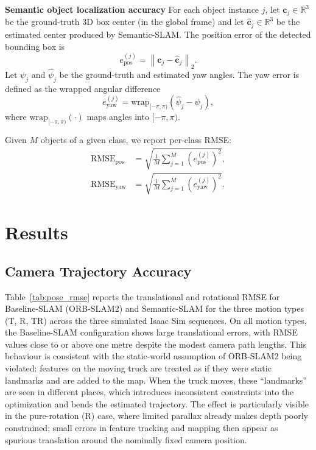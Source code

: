 \documentclass[letterpaper, 10 pt, conference]{IEEEtran}  %
\begin{document}
\noindent\textbf{Semantic object localization accuracy}
For each object instance $j$, let $\mathbf{c}_j\in\mathbb{R}^3$ be the ground-truth 3D box center (in the global frame) and let $\hat{\mathbf{c}}_j\in\mathbb{R}^3$ be the estimated center produced by Semantic-SLAM. The position error of the detected bounding box is
\begin{equation}
e^{(j)}_{\mathrm{pos}}=\left\lVert \mathbf{c}_j-\hat{\mathbf{c}}_j \right\rVert_2.
\label{eq:obj_pos_err}
\end{equation}
Let $\psi_j$ and $\hat{\psi}_j$ be the ground-truth and estimated yaw angles. The yaw error is defined as the wrapped angular difference
\begin{equation}
e^{(j)}_{\mathrm{yaw}}=\mathrm{wrap}_{[-\pi,\pi)}\!\left(\hat{\psi}_j-\psi_j\right),
\label{eq:obj_yaw_err}
\end{equation}
where $\mathrm{wrap}_{[-\pi,\pi)}(\cdot)$ maps angles into $[-\pi,\pi)$.

Given $M$ objects of a given class, we report per-class RMSE:
\begin{equation}
\begin{aligned}
\mathrm{RMSE}_{\mathrm{pos}} &= \sqrt{\frac{1}{M}\sum_{j=1}^{M}\left(e^{(j)}_{\mathrm{pos}}\right)^2},\\
\mathrm{RMSE}_{\mathrm{yaw}} &= \sqrt{\frac{1}{M}\sum_{j=1}^{M}\left(e^{(j)}_{\mathrm{yaw}}\right)^2}.
\end{aligned}
\label{eq:rmse_obj}
\end{equation}



\section{Results}
\label{sec:results}

\subsection{Camera Trajectory Accuracy}
Table~\ref{tab:pose_rmse} reports the translational and rotational RMSE for Baseline-SLAM (ORB-SLAM2) and Semantic-SLAM for the three motion types (T, R, TR) across the three simulated Isaac Sim sequences. On all motion types, the Baseline-SLAM configuration shows large translational errors, with RMSE values close to or above one metre despite the modest camera path lengths. This behaviour is consistent with the static-world assumption of ORB-SLAM2 being violated: features on the moving truck are treated as if they were static landmarks and are added to the map. When the truck moves, these “landmarks” are seen in different places, which introduces inconsistent constraints into the optimization and bends the estimated trajectory. The effect is particularly visible in the pure-rotation (R) case, where limited parallax already makes depth poorly constrained; small errors in feature tracking and mapping then appear as spurious translation around the nominally fixed camera position.
\end{document}
